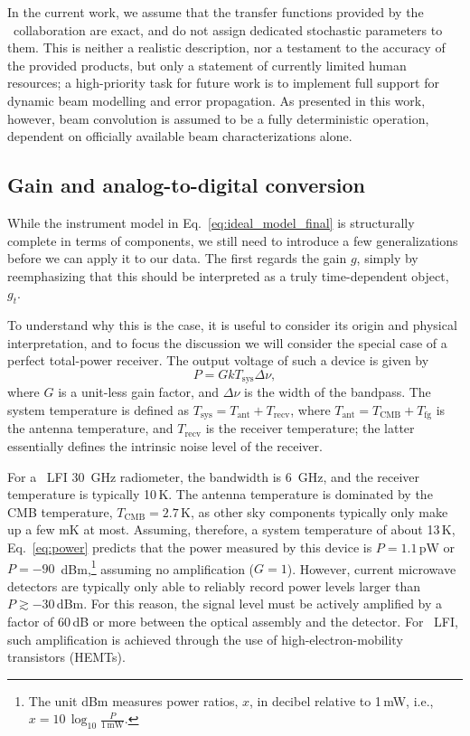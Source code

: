\documentclass[twocolumn]{aa}
\begin{document}
In the current work, we assume that the transfer functions provided by
the \Planck\ collaboration are exact, and do not assign dedicated
stochastic parameters to them. This is neither a realistic description, 
nor a testament to the accuracy of the provided
products, but only a statement of currently limited human resources; a
high-priority task for future work is to implement full support for
dynamic beam modelling and error propagation. As presented in this
work, however, beam convolution is assumed to be a fully deterministic
operation, dependent on officially available beam characterizations
alone.


\subsection{Gain and analog-to-digital conversion}
\label{sec:gain}

While the instrument model in Eq.~\eqref{eq:ideal_model_final} is
structurally complete in terms of components, we still need to
introduce a few generalizations before we can apply it to our
data. The first regards the gain $g$, simply by reemphasizing that
this should be interpreted as a truly time-dependent object, $g_t$.

To understand why this is the case, it is useful to consider its
origin and physical interpretation, and to focus the discussion we
will consider the special case of a perfect total-power receiver. The
output voltage of such a device is given by
\begin{equation}
  P = GkT_{\mathrm{sys}}\Delta\nu,
  \label{eq:power}
\end{equation}
where $G$ is a unit-less gain factor, and $\Delta\nu$ is the width of
the bandpass. The system temperature is defined as
$T_{\mathrm{sys}}=T_{\mathrm{ant}}+T_{\mathrm{recv}}$, where
$T_{\mathrm{ant}}=T_{\mathrm{CMB}} + T_{\mathrm{fg}}$ is the antenna temperature,
and $T_{\mathrm{recv}}$ is the receiver temperature; the latter
essentially defines the intrinsic noise level of the receiver.

For a \Planck\ LFI 30~GHz radiometer, the bandwidth is 6~GHz, and
the receiver temperature is typically 10\,K. The antenna temperature
is dominated by the CMB temperature, $T_{\mathrm{CMB}}=2.7$\,K, as other sky
components typically only make up a few mK at
most. Assuming, therefore, a system temperature of about 13\,K,
Eq.~\eqref{eq:power} predicts that the power measured by this device is
$P=1.1\,$pW or $P=-90$~dBm,\footnote{The unit dBm measures power
  ratios, $x$, in decibel relative to 1\,mW, i.e., $x = 10\,\log_{10}
  \frac{P}{1\,\mathrm{mW}}$.} assuming no amplification
($G=1$). However, current microwave detectors are typically only able
to reliably record power levels larger than $P\gtrsim-30\,$dBm. For
this reason, the signal level must be actively amplified by a factor
of 60\,dB or more between the optical assembly and the detector. For
\Planck\ LFI, such amplification is achieved through the use of
high-electron-mobility transistors (HEMTs).
\end{document}
